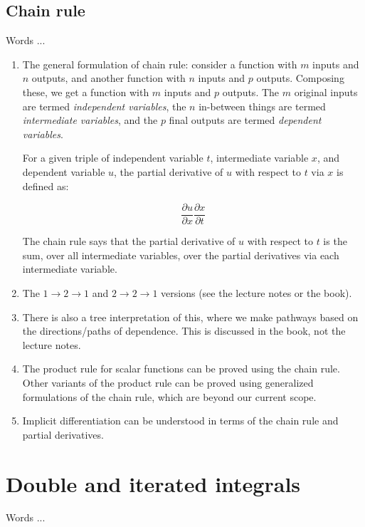 \documentclass[10pt]{amsart}
\begin{document}
\subsection{Chain rule}

Words ...

\begin{enumerate}
\item The general formulation of chain rule: consider a function with
  $m$ inputs and $n$ outputs, and another function with $n$ inputs and
  $p$ outputs. Composing these, we get a function with $m$ inputs and
  $p$ outputs. The $m$ original inputs are termed {\em independent
  variables}, the $n$ in-between things are termed {\em intermediate
  variables}, and the $p$ final outputs are termed {\em dependent
  variables}.

  For a given triple of independent variable $t$, intermediate
  variable $x$, and dependent variable $u$, the partial derivative of
  $u$ with respect to $t$ via $x$ is defined as:

  $$\frac{\partial u}{\partial x} \frac{\partial x}{\partial t}$$

  The chain rule says that the partial derivative of $u$ with respect
  to $t$ is the sum, over all intermediate variables, over the partial
  derivatives via each intermediate variable.
\item The $1 \to 2 \to 1$ and $2 \to 2 \to 1$ versions (see the
  lecture notes or the book).
\item There is also a tree interpretation of this, where we make
  pathways based on the directions/paths of dependence. This is
  discussed in the book, not the lecture notes.
\item The product rule for scalar functions can be proved using the
  chain rule. Other variants of the product rule can be proved using
  generalized formulations of the chain rule, which are beyond our
  current scope.
\item Implicit differentiation can be understood in terms of the chain
  rule and partial derivatives.
\end{enumerate}

\section{Double and iterated integrals}

Words ...
\end{document}
